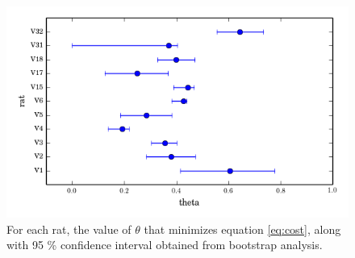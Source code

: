 \documentclass[twocolumn, prl]{revtex4}
\begin{document}
\begin{figure}
\begin{center}
\includegraphics[width=\columnwidth]{theta_error_95.png}
\caption{\label{fig:theta_error}For each rat, the value of $\theta$ that minimizes equation \ref{eq:cost}, along with 95 \% confidence interval obtained from bootstrap analysis.} \end{center}
\end{figure}


\end{document}

